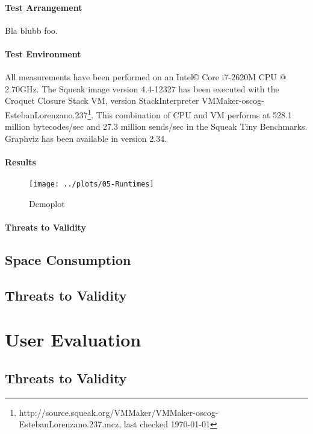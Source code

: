 \paragraph{Test Arrangement}
Bla blubb foo.

\paragraph{Test Environment} All measurements have been performed on an Intel\copyright{} Core\texttrademark{}  i7-2620M CPU @ 2.70GHz.
The Squeak image version 4.4-12327 has been executed with the Croquet Closure Stack VM, version StackInterpreter VMMaker-oscog-EstebanLorenzano.237\footnote{http://source.squeak.org/VMMaker/VMMaker-oscog-EstebanLorenzano.237.mcz, last checked \today}. This combination of CPU and VM performs at 528.1 million bytecodes/sec and 27.3 million sends/sec in the Squeak Tiny Benchmarks. Graphviz has been available in version 2.34.

\paragraph{Results}

\begin{figure}[h!]
	\centering
	\texttt{[image: ../plots/05-Runtimes]}
	\caption{Demoplot}
\end{figure}

\paragraph{Threats to Validity}

\subsection{Space Consumption}
\label{s:space-consumption}

\subsection{Threats to Validity}

\section{User Evaluation}
\subsection{Threats to Validity}

